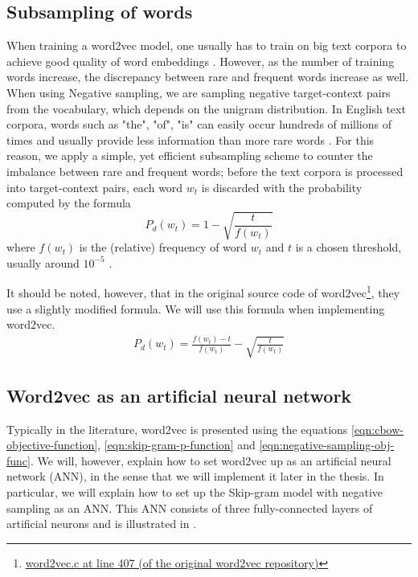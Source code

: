 \subsection{Subsampling of words}
When training a word2vec model, one usually has to train on big text corpora to achieve good quality of word embeddings \cite{mikolov2013a}. However, as the number of training words increase, the discrepancy between rare and frequent words increase as well. When using Negative sampling, we are sampling negative target-context pairs from the vocabulary, which depends on the unigram distribution. In English text corpora, words such as "the", "of", "is" can easily occur hundreds of millions of times and usually provide less information than more rare words \cite{mikolov2013b}. For this reason, we apply a simple, yet efficient subsampling scheme to counter the imbalance between rare and frequent words; before the text corpora is processed into target-context pairs, each word $w_t$ is discarded with the probability computed by the formula \cite{mikolov2013b, levy-etal-2015-improving}
\begin{equation}
    P_d(w_t) = 1 - \sqrt{\frac{t}{f(w_t)}}
\end{equation}
where $f(w_t)$ is the (relative) frequency of word $w_t$ and $t$ is a chosen threshold, usually around $10^{-5}$ \cite{mikolov2013b}.

\noindent
It should be noted, however, that in the original source code of word2vec\footnote{\href{https://github.com/tmikolov/word2vec/blob/e092540633572b883e25b367938b0cca2cf3c0e7/word2vec.c\#L407}{word2vec.c at line 407 (of the original word2vec repository)}}, they use a slightly modified formula. We will use this formula when implementing word2vec.
\begin{align}
    P_d(w_t) = \frac{f(w_t) - t}{f(w_t)} - \sqrt{\frac{t}{f(w_t)}}
\end{align}

\subsection{Word2vec as an artificial neural network}
Typically in the literature, word2vec is presented using the equations \ref{eqn:cbow-objective-function}, \ref{eqn:skip-gram-p-function} and \ref{eqn:negative-sampling-obj-func}. We will, however, explain how to set word2vec up as an artificial neural network (ANN), in the sense that we will implement it later in the thesis. In particular, we will explain how to set up the Skip-gram model with negative sampling as an ANN. This ANN consists of three fully-connected layers of artificial neurons \cite{rong2014word2vec} and is illustrated in .

